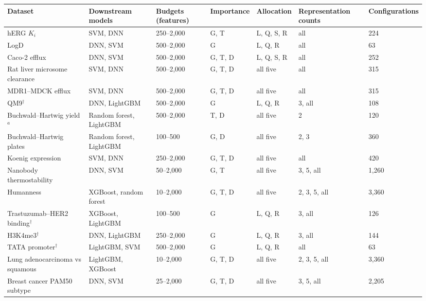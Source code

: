 \begin{table}[htbp]
\centering
\small
\setlength{\tabcolsep}{3pt}
\begin{adjustbox}{max width=\textwidth,max totalheight=0.78\textheight}
\begin{tabular}{@{}lllllll@{}}
\toprule
Dataset & Downstream models & Budgets (features) & Importance & Allocation & Representation counts & Configurations \\
\midrule
hERG $K_i$ & SVM, DNN & 250--2{,}000 & G, T & L, Q, S, R & all & 224 \\
LogD & DNN, SVM & 500--2{,}000 & G & L, Q, R & all & 63 \\
Caco-2 efflux & DNN, SVM & 500--2{,}000 & G, T, D & L, Q, S, R & all & 252 \\
Rat liver microsome clearance & SVM, DNN & 500--2{,}000 & G, T, D & all five & all & 315 \\
MDR1--MDCK efflux & SVM, DNN & 500--2{,}000 & G, T, D & all five & all & 315 \\
QM9$^{\dagger}$ & DNN, LightGBM & 500--2{,}000 & G & L, Q, R & 3, all & 108 \\
Buchwald--Hartwig yield$^{a}$ & Random forest, LightGBM & 500--2{,}000 & T, D & all five & 2 & 120 \\
Buchwald--Hartwig plates & Random forest, LightGBM & 100--500 & G, D & all five & 2, 3 & 360 \\
Koenig expression & SVM, DNN & 250--2{,}000 & G, T, D & all five & all & 420 \\
Nanobody thermostability & DNN, SVM & 50--2{,}000 & G, T & all five & 3, 5, all & 1{,}260 \\
Humanness & XGBoost, random forest & 10--2{,}000 & G, T, D & all five & 2, 3, 5, all & 3{,}360 \\
Trastuzumab--HER2 binding$^{\dagger}$ & XGBoost, LightGBM & 100--500 & G & L, Q, R & 3, all & 126 \\
H3K4me3$^{\dagger}$ & DNN, LightGBM & 250--2{,}000 & G & L, Q, R & 3, all & 144 \\
TATA promoter$^{\dagger}$ & LightGBM, SVM & 500--2{,}000 & G & L, Q, R & all & 63 \\
Lung adenocarcinoma vs squamous & LightGBM, XGBoost & 10--2{,}000 & G, T, D & all five & 2, 3, 5, all & 3{,}360 \\
Breast cancer PAM50 subtype & DNN, SVM & 25--2{,}000 & G, T, D & all five & 3, 5, all & 2{,}205 \\
\bottomrule
\end{tabular}
\end{adjustbox}


\end{table}
